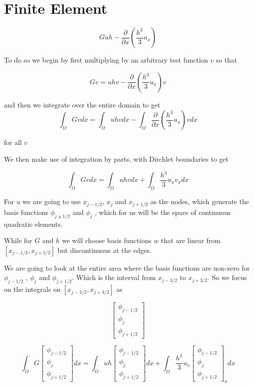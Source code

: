 \documentclass[12pt]{article}
\begin{document}
\section{Finite Element}

\[G  uh - \frac{\partial}{\partial x}\left(\frac{h^3}{3}u_x\right)\]

To do so we begin by first multiplying by an arbitrary test function $v$ so that

\[Gv = uhv  - \frac{\partial}{\partial x}\left(\frac{h^3}{3}u_x\right)v\]

and then we integrate over the entire domain to get 
\[\int_\Omega Gv dx = \int_\Omega uhv dx - \int_\Omega \frac{\partial}{\partial x}\left(\frac{h^3}{3}u_x\right)vdx\]

for all $v$

We then make use of integration by parts, with Dirchlet boundaries to get

\[\int_\Omega Gv dx = \int_\Omega uhv dx + \int_\Omega\frac{h^3}{3}u_{x}v_xdx\]

For $u$ we are going to use $x_{j - 1/2}$, $x_{j}$ and $x_{j + 1/2}$ as the nodes, which generate the basis functions $\phi_{j \pm 1/2}$ and $\phi_{j}$ , which for us will be the space of continuous quadratic elements. 

While for $G$  and $h$ we will choose basis functions $w$ that are linear from $[x_{j-1/2}, x_{j+1/2}]$ but discontinuous at the edges.

We are going to look at the entire area where the basis functions are non-zero for $\phi_{j-1/2}$ , $\phi_{j}$ and $\phi_{j+1/2}$. Which is the interval from $x_{j-3/2}$ to $x_{j+3/2}$. So we focus on the integrals on $[x_{j-3/2}, x_{j+3/2}]$ as 

\[\left[\begin{array}{c}\phi_{j-1/2} \\\phi_{j}\\\phi_{j+1/2} \end{array}\right]\]

\[\int_\Omega G\left[\begin{array}{c}\phi_{j-1/2} \\\phi_{j}\\\phi_{j+1/2} \end{array}\right]  dx = \int_\Omega uh \left[\begin{array}{c}\phi_{j-1/2} \\\phi_{j}\\\phi_{j+1/2} \end{array}\right] dx + \int_\Omega\frac{h^3}{3}u_{x}\left[\begin{array}{c}\phi_{j-1/2} \\\phi_{j}\\\phi_{j+1/2} \end{array}\right]_xdx\]
\end{document}
